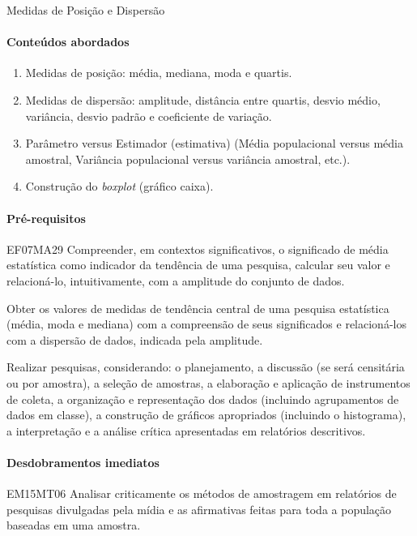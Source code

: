 \begin{apresentacao}{Medidas de Posição e Dispersão}
\paragraph{Conteúdos abordados}

\begin{enumerate}
\item Medidas de posição: média, mediana, moda e quartis.
\item Medidas de dispersão: amplitude, distância entre quartis, desvio médio, variância, desvio padrão e coeficiente de variação.
\item Parâmetro versus Estimador (estimativa) (Média populacional versus média amostral, Variância populacional versus variância amostral, etc.).
\item Construção do \textit{boxplot} (gráfico caixa).
\end{enumerate}

\paragraph{Pré-requisitos}

\begin{habilities}{EF07MA29} Compreender, em contextos significativos, o significado de média estatística como indicador da tendência de uma pesquisa, calcular seu valor e relacioná-lo, intuitivamente, com a amplitude do conjunto de dados.

 Obter os valores de medidas de tendência central de uma pesquisa estatística (média, moda e mediana) com a compreensão de seus significados e relacioná-los com a dispersão de dados, indicada pela amplitude.

 Realizar pesquisas, considerando: o planejamento, a discussão (se será censitária ou por amostra), a seleção de amostras, a elaboração e aplicação de instrumentos de coleta, a organização e representação dos dados (incluindo agrupamentos de dados em classe), a construção de gráficos apropriados (incluindo o histograma), a interpretação e a análise crítica apresentadas em relatórios descritivos.
\end{habilities}

\paragraph{Desdobramentos imediatos}

\begin{habilities}{EM15MT06} Analisar criticamente os métodos de amostragem em relatórios de pesquisas divulgadas pela mídia e as afirmativas feitas para toda a população baseadas em uma amostra.
\end{habilities}


\end{apresentacao}

